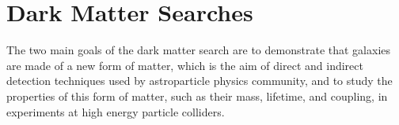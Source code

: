 \section{Dark Matter Searches}
\label{secParticleDMsearches}

The two main goals of the dark matter search are to demonstrate that galaxies are made of a new form of matter, which is the aim of direct and indirect detection techniques used by astroparticle physics community,  and to study the properties of this form of matter, such as their mass, lifetime, and coupling, in experiments at high energy particle colliders. 

